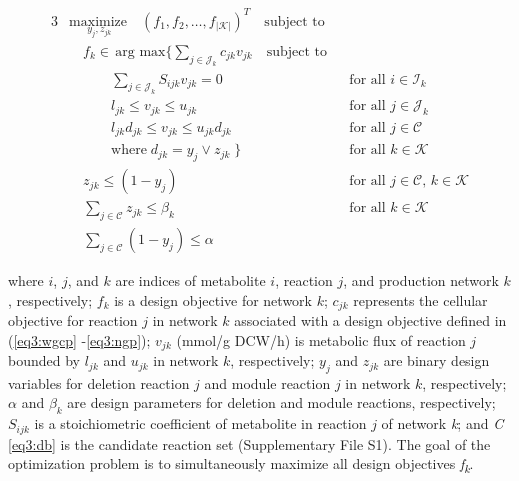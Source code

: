 \begin{alignat}{3}
    & \underset{ \; y_j, z_{jk}}{\textrm{maximize}} \quad (f_1, f_2, \ldots, f_{|\mathcal{K}|})^T \quad \text{subject to}  \label{eq3:of1} \\
	&  \quad f_k \in \, \text{arg }\underset{}{\text{max}} \Bigg\{\sum_{j \in \mathcal{J}_k} c_{jk}  v_{jk} \quad \text{subject to} \label{eq3:of2}\\
	& \quad \qquad \sum_{j\in \mathcal{J}_k}S_{ijk}v_{jk} = 0 && \text{for all } i \in \mathcal{I}_k  \label{eq3:mb}\\
	& \quad \qquad  l_{jk} \le v_{jk} \le u_{jk}  && \text{for all } j \in \mathcal{J}_k \label{eq3:rb}\\
	& \quad \qquad  l_{jk} d_{jk} \le v_{jk} \le u_{jk} d_{jk} && \text{for all } j \in \mathcal{C} \label{eq3:db}\\
	& \quad \qquad \mathrm{where} \; d_{jk} = y_j \lor z_{jk} \; \Bigg\} && \text{for all } k \in \mathcal{K} \nonumber \\
	& \quad z_{jk}\le (1-y_j) && \text{for all } j \in \mathcal{C}, \, k \in \mathcal{K} \label{eq3:mr1}\\
	& \quad \sum_{j \in \mathcal{C}}z_{jk} \le \beta_k && \text{for all } k \in \mathcal{K} \label{eq3:mr2} \\
	& \quad \sum_{j \in \mathcal{C}} (1-y_j) \le \alpha \label{eq3:a}
\end{alignat}

\noindent where $i$, $j$, and $k$ are indices of metabolite $i$, reaction $j$, and production network $k$, respectively; $f_k$ is a design objective for network $k$; $c_{jk}$ represents the cellular objective for reaction $j$ in network $k$ associated with a design objective defined in (\ref{eq3:wgcp} -\ref{eq3:ngp}); $v_{jk}$ (mmol/g DCW/h) is metabolic flux of reaction $j$ bounded by $l_{jk}$ and $u_{jk}$ in network $k$, respectively; $y_j$ and $z_{jk}$ are binary design variables for deletion reaction $j$ and module reaction $j$ in network $k$, respectively; $\alpha$ and $\beta_k$ are design parameters for deletion and module reactions, respectively; $S_{ijk}$ is a stoichiometric coefficient of metabolite in reaction $j$ of network \emph{k}; and \emph{C} \eqref{eq3:db} is the candidate reaction set (Supplementary File S1).
The goal of the optimization problem is to simultaneously maximize all design objectives \emph{f\textsubscript{k}}.

